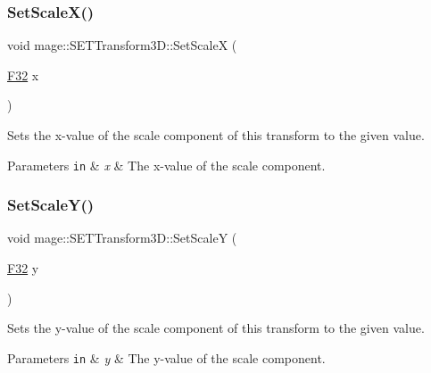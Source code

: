 \subsubsection{\texorpdfstring{Set\+Scale\+X()}{SetScaleX()}}
{\footnotesize\ttfamily void mage\+::\+S\+E\+T\+Transform3\+D\+::\+Set\+ScaleX (\begin{DoxyParamCaption}\item[{\mbox{\hyperlink{namespacemage_aa97e833b45f06d60a0a9c4fc22ae02c0}{F32}}}]{x }\end{DoxyParamCaption})\hspace{0.3cm}{\ttfamily [noexcept]}}

Sets the x-\/value of the scale component of this transform to the given value.


\begin{DoxyParams}[1]{Parameters}
\mbox{\tt in}  & {\em x} & The x-\/value of the scale component. \\
\hline
\end{DoxyParams}
\mbox{\label{classmage_1_1_s_e_t_transform3_d_a7f36c0d3dbb1eec4634fbbcbeca10ae7}} 
\subsubsection{\texorpdfstring{Set\+Scale\+Y()}{SetScaleY()}}
{\footnotesize\ttfamily void mage\+::\+S\+E\+T\+Transform3\+D\+::\+Set\+ScaleY (\begin{DoxyParamCaption}\item[{\mbox{\hyperlink{namespacemage_aa97e833b45f06d60a0a9c4fc22ae02c0}{F32}}}]{y }\end{DoxyParamCaption})\hspace{0.3cm}{\ttfamily [noexcept]}}

Sets the y-\/value of the scale component of this transform to the given value.


\begin{DoxyParams}[1]{Parameters}
\mbox{\tt in}  & {\em y} & The y-\/value of the scale component. \\
\hline
\end{DoxyParams}
\mbox{\label{classmage_1_1_s_e_t_transform3_d_a012dc80a6e26ac41954e49b82ee05904}} 
